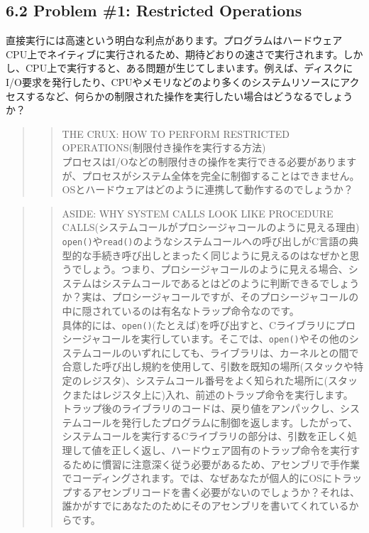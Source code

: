 \hypertarget{problem-1-restricted-operations}{%
\subsection*{6.2 Problem \#1: Restricted
Operations}\label{problem-1-restricted-operations}}

直接実行には高速という明白な利点があります。プログラムはハードウェアCPU上でネイティブに実行されるため、期待どおりの速さで実行されます。しかし、CPU上で実行すると、ある問題が生じてしまいます。例えば、ディスクにI/O要求を発行したり、CPUやメモリなどのより多くのシステムリソースにアクセスするなど、何らかの制限された操作を実行したい場合はどうなるでしょうか？

\begin{quote}
\begin{quote}
THE CRUX: HOW TO PERFORM RESTRICTED
OPERATIONS(制限付き操作を実行する方法)\\
プロセスはI/Oなどの制限付きの操作を実行できる必要がありますが、プロセスがシステム全体を完全に制御することはできません。OSとハードウェアはどのように連携して動作するのでしょうか？
\end{quote}
\end{quote}

\begin{quote}
\begin{quote}
ASIDE: WHY SYSTEM CALLS LOOK LIKE PROCEDURE
CALLS(システムコールがプロシージャコールのように見える理由)\\
\texttt{open()}や\texttt{read()}のようなシステムコールへの呼び出しがC言語の典型的な手続き呼び出しとまったく同じように見えるのはなぜかと思うでしょう。つまり、プロシージャコールのように見える場合、システムはシステムコールであるとはどのように判断できるでしょうか？実は、プロシージャコールですが、そのプロシージャコールの中に隠されているのは有名なトラップ命令なのです。\\
具体的には、\texttt{open()}(たとえば)を呼び出すと、Cライブラリにプロシージャコールを実行しています。そこでは、\texttt{open()}やその他のシステムコールのいずれにしても、ライブラリは、カーネルとの間で合意した呼び出し規約を使用して、引数を既知の場所(スタックや特定のレジスタ)、システムコール番号をよく知られた場所に(スタックまたはレジスタ上に)入れ、前述のトラップ命令を実行します。\\
トラップ後のライブラリのコードは、戻り値をアンパックし、システムコールを発行したプログラムに制御を返します。したがって、システムコールを実行するCライブラリの部分は、引数を正しく処理して値を正しく返し、ハードウェア固有のトラップ命令を実行するために慣習に注意深く従う必要があるため、アセンブリで手作業でコーディングされます。では、なぜあなたが個人的にOSにトラップするアセンブリコードを書く必要がないのでしょうか？それは、誰かがすでにあなたのためにそのアセンブリを書いてくれているからです。
\end{quote}
\end{quote}

